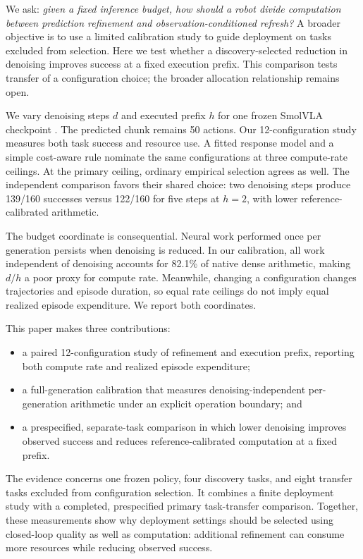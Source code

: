\documentclass{article}
\begin{document}
We ask: \emph{given a fixed inference budget, how should a robot divide
computation between prediction refinement and observation-conditioned refresh?}
A broader objective is to use a limited calibration study to guide deployment
on tasks excluded from selection. Here we test whether a discovery-selected
reduction in denoising improves success at a fixed execution prefix. This
comparison tests transfer of a configuration choice; the broader allocation
relationship remains open.

We vary denoising steps $d$ and executed prefix $h$ for one frozen SmolVLA
checkpoint \cite{smolvla}. The predicted chunk remains 50 actions. Our
12-configuration study measures both task success and resource use. A fitted
response model and a simple cost-aware rule nominate the same configurations
at three compute-rate ceilings. At the primary ceiling, ordinary empirical
selection agrees as well. The independent comparison favors their shared choice:
two denoising steps produce 139/160 successes versus 122/160 for five steps at
$h=2$, with lower reference-calibrated arithmetic.

The budget coordinate is consequential. Neural work performed once per
generation persists when denoising is reduced. In our calibration, all work
independent of denoising accounts for 82.1\% of native dense arithmetic, making $d/h$ a poor
proxy for compute rate. Meanwhile, changing a configuration changes trajectories
and episode duration, so equal rate ceilings do not imply equal realized
episode expenditure. We report both coordinates.

This paper makes three contributions:
\begin{itemize}[leftmargin=*,nosep]
    \item a paired 12-configuration study of refinement and execution prefix,
    reporting both compute rate and realized episode expenditure;
    \item a full-generation calibration that measures denoising-independent
    per-generation arithmetic under an explicit operation boundary; and
    \item a prespecified, separate-task comparison in which lower denoising
    improves observed success and reduces reference-calibrated computation at
    a fixed prefix.
\end{itemize}
The evidence concerns one frozen policy, four discovery tasks, and eight
transfer tasks excluded from configuration selection. It combines a finite
deployment study with a completed, prespecified primary task-transfer
comparison. Together, these measurements show why deployment settings should
be selected using closed-loop quality as well as computation: additional
refinement can consume more resources while reducing observed success.
\end{document}
